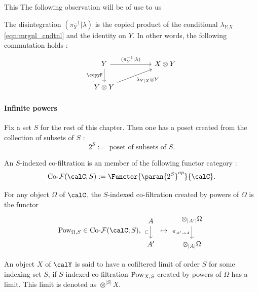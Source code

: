 \documentclass[12pt,oneside,pb-diagram]{article}
\begin{document}
This
The following observation will be of use to us

\begin{lemma} \label{lem:2fi03}
	The disintegration $(\pi_Y^{-1}|\lambda)$ is the copied product of the conditional $\lambda_{Y|X}$ \eqref{eqn:mrgnl_cndtnl} and the identity on $Y$. In other words, the following commutation holds :
	\begin{equation} \label{eqn:disinteg_cndtnl}
		\begin{tikzcd}
			Y \arrow[d, "\copyF"'] \arrow[rr, "(\pi_Y^{-1}|\lambda)"] && X \otimes Y \\
			Y \otimes Y \arrow[urr, "\lambda_{Y|X} \otimes Y"']
		\end{tikzcd}
	\end{equation}
\end{lemma}

\paragraph{Infinite powers} Fix a set $S$ for the rest of this chapter. Then one has a poset created from the collection of subsets of $S$ :
%
\[ 2^{S} := \text{ poset of subsets of } S .\]
%

\begin{definition} [Co-filtration] \label{def:cofltr}
	An $S$-indexed co-filtration is an member of the following functor category :
	\[ \CoFilter(\calC; S) := \Functor{ \paran{2^S}^{op} }{ \calC }. \]
\end{definition}

\begin{definition}  \label{def:power_cofilter}
	For any object $\Omega$ of $\calC$, the  $S$-indexed co-filtration created by powers of $\Omega$ is the functor 
	\[ \Pow_{\Omega, S} \in \CoFilter(\calC; S), \, 
	\begin{tikzcd} A \arrow[d, "\subset"'] \\ A' \end{tikzcd} \,\mapsto\, 
	\begin{tikzcd} \otimes_{|A'|} \Omega \arrow[d, "\pi_{A'\to A}"'] \\ \otimes_{|A|} \Omega \end{tikzcd}\]
\end{definition}

\begin{definition} 
	An object $X$ of $\calY$ is said to have a cofiltered limit of order $S$ for some indexing set $S$, if $S$-indexed co-filtration $\operatorname{Pow}_{X, S}$ created by powers of $\Omega$ has a limit. This limit is denoted as $\otimes^{|S|} X$.
\end{definition}
\end{document}
